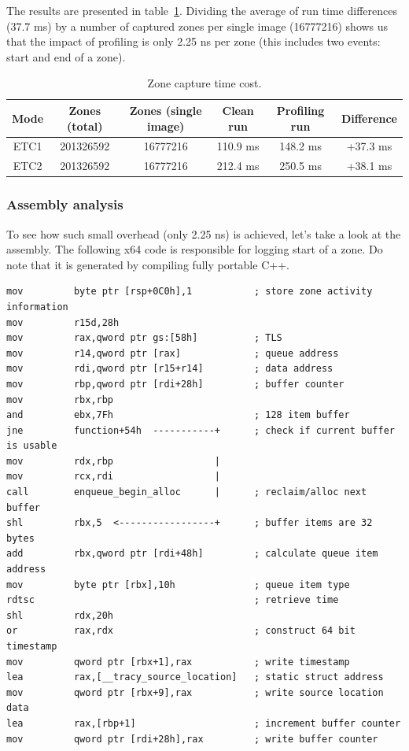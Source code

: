 \documentclass[hidelinks,titlepage,a4paper]{article}
\begin{document}
The results are presented in table~\ref{PerformanceImpact}. Dividing the average of run time differences (37.7 \si{\milli\second}) by a number of captured zones per single image (\num{16777216}) shows us that the impact of profiling is only 2.25 \si{\nano\second} per zone (this includes two events: start and end of a zone).

\begin{table}[h]
\centering
\begin{tabular}[h]{c|c|c|c|c|c}
\textbf{Mode} & \textbf{Zones (total)} & \textbf{Zones (single image)} & \textbf{Clean run} & \textbf{Profiling run} & \textbf{Difference} \\ \hline
ETC1 & \num{201326592} & \num{16777216} & 110.9 \si{\milli\second} & 148.2 \si{\milli\second} & +37.3 \si{\milli\second} \\
ETC2 & \num{201326592} & \num{16777216} & 212.4 \si{\milli\second} & 250.5 \si{\milli\second} & +38.1 \si{\milli\second}
\end{tabular}
\caption{Zone capture time cost.}
\label{PerformanceImpact}
\end{table}

\subsubsection{Assembly analysis}

To see how such small overhead (only 2.25 \si{\nano\second}) is achieved, let's take a look at the assembly. The following x64 code is responsible for logging start of a zone. Do note that it is generated by compiling fully portable C++.

\begin{lstlisting}[language={[x86masm]Assembler}]
mov         byte ptr [rsp+0C0h],1           ; store zone activity information
mov         r15d,28h
mov         rax,qword ptr gs:[58h]          ; TLS
mov         r14,qword ptr [rax]             ; queue address
mov         rdi,qword ptr [r15+r14]         ; data address
mov         rbp,qword ptr [rdi+28h]         ; buffer counter
mov         rbx,rbp
and         ebx,7Fh                         ; 128 item buffer
jne         function+54h  -----------+      ; check if current buffer is usable
mov         rdx,rbp                  |
mov         rcx,rdi                  |
call        enqueue_begin_alloc      |      ; reclaim/alloc next buffer
shl         rbx,5  <-----------------+      ; buffer items are 32 bytes
add         rbx,qword ptr [rdi+48h]         ; calculate queue item address
mov         byte ptr [rbx],10h              ; queue item type
rdtsc                                       ; retrieve time
shl         rdx,20h
or          rax,rdx                         ; construct 64 bit timestamp
mov         qword ptr [rbx+1],rax           ; write timestamp
lea         rax,[__tracy_source_location]   ; static struct address
mov         qword ptr [rbx+9],rax           ; write source location data
lea         rax,[rbp+1]                     ; increment buffer counter
mov         qword ptr [rdi+28h],rax         ; write buffer counter
\end{lstlisting}
\end{document}
